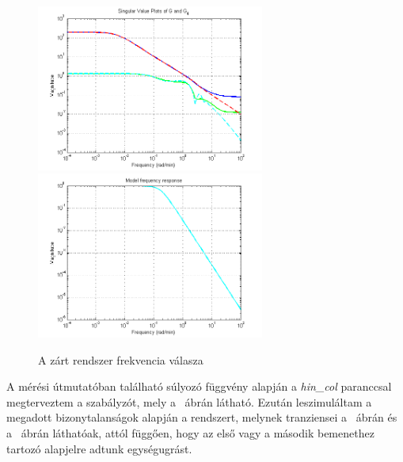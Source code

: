 \begin{figure}[!ht]
	\includegraphics[width=75mm,keepaspectratio]{figures/2m06/olp_old_1_.png}
	\includegraphics[width=75mm,keepaspectratio]{figures/2m06/olp_old_2_.png}
	\caption{A zárt rendszer frekvencia válasza}
	\label{fig:Init}
\end{figure}

A mérési útmutatóban található súlyozó függvény alapján a \textit{hin\_col} paranccsal megterveztem a szabályzót, mely a ~ábrán látható. Ezután leszimuláltam a megadott bizonytalanságok alapján a rendszert, melynek tranziensei a ~ábrán és a ~ábrán láthatóak, attól függően, hogy az első vagy a második bemenethez tartozó alapjelre adtunk egységugrást.

